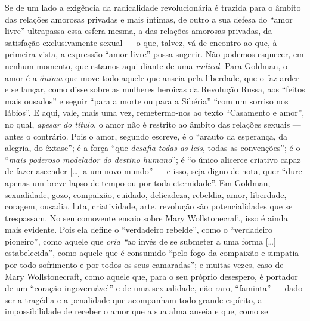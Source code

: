 Se de um lado a exigência da radicalidade revolucionária é trazida para
o âmbito das relações amorosas privadas e mais íntimas, de outro a sua
defesa do ``amor livre'' ultrapassa essa esfera mesma, a das relações
amorosas privadas, da satisfação exclusivamente sexual --- o que, talvez,
vá de encontro ao que, à primeira vista, a expressão ``amor livre''
possa sugerir. Não podemos esquecer, em nenhum momento, que estamos aqui
diante de uma \emph{radical}. Para Goldman, o amor é a \emph{ânima} que
move todo aquele que anseia pela liberdade, que o faz arder e se lançar,
como disse sobre as mulheres heroicas da Revolução Russa, aos ``feitos
mais ousados'' ​​e seguir ``para a morte ou para a Sibéria'' ``com um
sorriso nos lábios''. E aqui, vale, mais uma vez, remetermo-nos ao texto
``Casamento e amor'', no qual, \emph{apesar do título}, o amor não é
restrito ao âmbito das relações sexuais --- antes o contrário. Pois o
amor, segundo escreve, é o ``arauto da esperança, da alegria, do
êxtase''; é a força ``que \emph{desafia todas as leis}, todas as
convenções''; é o ``\emph{mais poderoso modelador do destino humano}'';
é ``o único alicerce criativo capaz de fazer ascender {[}\ldots{]} a um
novo mundo'' --- e isso, seja digno de nota, quer ``dure apenas um breve
lapso de tempo ou por toda eternidade''. Em Goldman, sexualidade, gozo,
compaixão, cuidado, delicadeza, rebeldia, amor, liberdade, coragem,
ousadia, luta, criatividade, arte, revolução são potencialidades que se
trespassam. No seu comovente ensaio sobre Mary Wollstonecraft, isso é
ainda mais evidente. Pois ela define o ``verdadeiro rebelde'', como o
``verdadeiro pioneiro'', como aquele que \emph{cria ``}ao invés de se
submeter a uma forma {[}\ldots{]} estabelecida'', como aquele que é
consumido ``pelo fogo da compaixão e simpatia por todo sofrimento e por
todos os seus camaradas''; e muitas vezes, caso de Mary Wollstonecraft,
como aquele que, para o seu próprio desespero, é portador de um
``coração ingovernável'' e de uma sexualidade, não raro, ``faminta'' ---
dado ser a tragédia e a penalidade que acompanham todo grande espírito,
a impossibilidade de receber o amor que a sua alma anseia e que, como se
